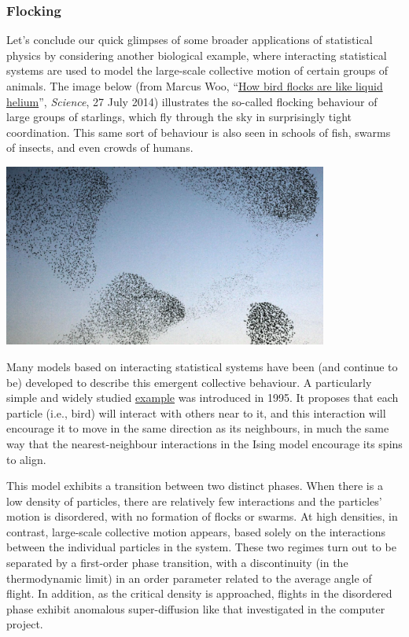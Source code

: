 \subsubsection*{Flocking}
Let's conclude our quick glimpses of some broader applications of statistical physics by considering another biological example, where interacting statistical systems are used to model the large-scale collective motion of certain groups of animals.
The image below (from Marcus Woo, ``\href{https://www.sciencemag.org/news/2014/07/how-bird-flocks-are-liquid-helium}{How bird flocks are like liquid helium}'', \textit{Science}, 27 July 2014) illustrates the so-called flocking behaviour of large groups of starlings, which fly through the sky in surprisingly tight coordination.
This same sort of behaviour is also seen in schools of fish, swarms of insects, and even crowds of humans.

\begin{center}\includegraphics[width=0.8\textwidth]{figs/week11_flock.pdf}\end{center}

Many models based on interacting statistical systems have been (and continue to be) developed to describe this emergent collective behaviour.
A particularly simple and widely studied \href{https://en.wikipedia.org/wiki/Vicsek_model}{example} was introduced in 1995.
It proposes that each particle (i.e., bird) will interact with others near to it, and this interaction will encourage it to move in the same direction as its neighbours, in much the same way that the nearest-neighbour interactions in the Ising model encourage its spins to align.

This model exhibits a transition between two distinct phases.
When there is a low density of particles, there are relatively few interactions and the particles' motion is disordered, with no formation of flocks or swarms.
At high densities, in contrast, large-scale collective motion appears, based solely on the interactions between the individual particles in the system.
These two regimes turn out to be separated by a first-order phase transition, with a discontinuity (in the thermodynamic limit) in an order parameter related to the average angle of flight.
In addition, as the critical density is approached, flights in the disordered phase exhibit anomalous super-diffusion like that investigated in the computer project.



